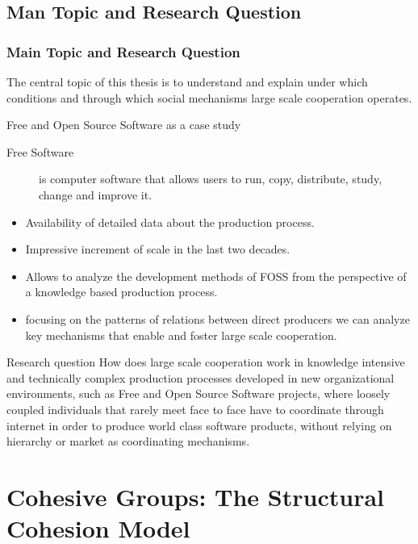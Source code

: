 \documentclass[ignorenonframetext,red,8pt,notes=show]{beamer}
\begin{document}
\subsection{Man Topic and Research Question}
\begin{frame}[label=]
\frametitle{Main Topic and Research Question}

The central topic of this thesis is to understand and explain under which conditions and through which social mechanisms large scale cooperation operates. 

\begin{block}{Free and Open Source Software as a case study}
\begin{description}
\item[Free Software] is computer software that allows users to run, copy, distribute, study, change and improve it.  
\end{description}
\begin{itemize}
\item Availability of detailed data about the production process.
\item Impressive increment of scale in the last two decades.
\item Allows to analyze the development methods of FOSS from the perspective of a knowledge based production process.
\item focusing on the patterns of relations between direct producers we can analyze key mechanisms that enable and foster large scale cooperation.
\end{itemize}
\end{block}

\begin{block}{Research question}
How does large scale cooperation work in knowledge intensive and technically complex production processes developed in new organizational environments, such as Free and Open Source Software projects, where loosely coupled individuals that rarely meet face to face have to coordinate through internet in order to produce world class software products, without relying on hierarchy or market as coordinating mechanisms.
\end{block}
\end{frame}


\section{Cohesive Groups: The Structural Cohesion Model}
\end{document}
